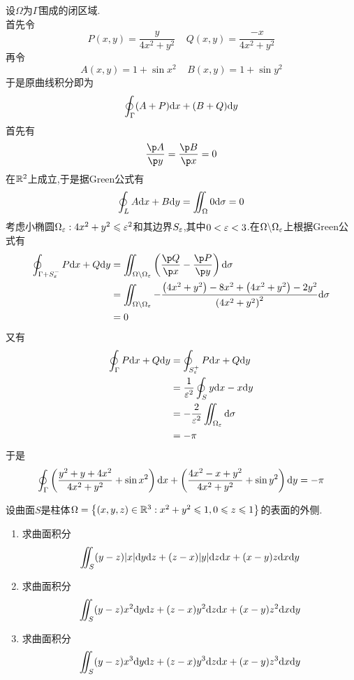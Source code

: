 \documentclass{ctexart}
\begin{document}
\begin{solution}
    设$\Omega$为$\Gamma$围成的闭区域.\\
    首先令
    \[P(x,y)=\dfrac{y}{4x^2+y^2}\ \ \ \ \ Q(x,y)=\dfrac{-x}{4x^2+y^2}\]
    再令
    \[A(x,y)=1+\sin x^2\ \ \ \ \ B(x,y)=1+\sin y^2\]
    于是原曲线积分即为
    \[\oint_{\Gamma}(A+P)\mathrm{d} x+(B+Q)\mathrm{d} y\]
    首先有
    \[\dfrac{\p A}{\p y}=\dfrac{\p B}{\p x}=0\]
    在$\mathbb{R}^2$上成立,于是据Green公式有
    \[\oint_{L}A\mathrm{d} x+B\mathrm{d} y=\iint_{\Omega}0\mathrm{d}\sigma=0\]
    考虑小椭圆$\Omega_\varepsilon:4x^2+y^2\leqslant\varepsilon^2$和其边界$S_\varepsilon$,其中$0<\varepsilon<3$.在$\Omega\backslash\Omega_\varepsilon$上根据Green公式有
    \[\begin{aligned}
        \oint_{\Gamma+S_\ep^-}P\di x+Q\di y
        &= \iint_{\Omega\backslash\Omega_\ep}\left(\dfrac{\p Q}{\p x}-\dfrac{\p P}{\p y}\right)\di\sigma \\
        &= \iint_{\Omega\backslash\Omega_\ep}-\dfrac{\left(4x^2+y^2\right)-8x^2+\left(4x^2+y^2\right)-2y^2}{\left(4x^2+y^2\right)^2}\di\sigma \\
        &= 0
    \end{aligned}\]
    又有
    \[\begin{aligned}
        \oint_{\Gamma}P\mathrm{d} x+Q\mathrm{d} y
        &= \oint_{S_\varepsilon^+}P\mathrm{d} x+Q\mathrm{d} y \\
        &= \dfrac{1}{\varepsilon^2}\oint_Sy\mathrm{d} x-x\mathrm{d} y \\
        &= -\dfrac{2}{\varepsilon^2}\iint_{\Omega_\varepsilon}\mathrm{d}\sigma \\
        &= -\pi
    \end{aligned}\]
    于是
    \[\oint_{\Gamma}\left(\dfrac{y^2+y+4x^2}{4x^2+y^2}+\sin x^2\right)\mathrm{d} x+\left(\dfrac{4x^2-x+y^2}{4x^2+y^2}+\sin y^2\right)\mathrm{d} y=-\pi\]

\end{solution}
\begin{problem}[10.(10\songti{分})]
    设曲面$S$是柱体$\Omega=\left\{(x,y,z)\in\mathbb{R}^3:x^2+y^2\leqslant1,0\leqslant z\leqslant1\right\}$的表面的外侧.
    \begin{enumerate}[label=\tbf{(\arabic*)}]
        \item 求曲面积分
            \[\iint_S(y-z)|x|\mathrm{d} y\mathrm{d} z+(z-x)|y|\mathrm{d} z\mathrm{d} x+(x-y)z\mathrm{d} x\mathrm{d} y\]
        \item 求曲面积分
            \[\iint_S(y-z)x^2\mathrm{d} y\mathrm{d} z+(z-x)y^2\mathrm{d} z\mathrm{d} x+(x-y)z^2\mathrm{d} x\mathrm{d} y\]
        \item 求曲面积分
            \[\iint_S(y-z)x^3\mathrm{d} y\mathrm{d} z+(z-x)y^3\mathrm{d} z\mathrm{d} x+(x-y)z^3\mathrm{d} x\mathrm{d} y\]
    \end{enumerate}
\end{problem}
\end{document}
